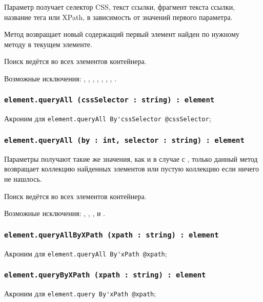 Параметр  получает селектор CSS, текст ссылки, фрагмент текста ссылки, название тега или XPath, в зависимость от значений первого параметра.

Метод возвращает новый \element{} содержащий первый элемент найден по нужному методу в текущем элементе.

\code{[icL]} Поиск ведётся во всех элементов контейнера.

Возможные исключения: , , , , , , , .

\subsubsection{\lstinline|element.queryAll (cssSelector : string) : element|}

Акроним для \lstinline|element.queryAll By'cssSelector @cssSelector|;

\subsubsection{\lstinline|element.queryAll (by : int, selector : string) : element|}

Параметры получают такие же значения, как и в случае с , только данный метод возвращает коллекцию найденных элементов или пустую коллекцию если ничего не нашлось.

\code{[icL]} Поиск ведётся во всех элементов контейнера.

Возможные исключения: , , ,  и .

\subsubsection{\lstinline|element.queryAllByXPath (xpath : string) : element|}

Акроним для \lstinline|element.queryAll By'xPath @xpath|;

\subsubsection{\lstinline|element.queryByXPath (xpath : string) : element|}

Акроним для \lstinline|element.query By'xPath @xpath|;

